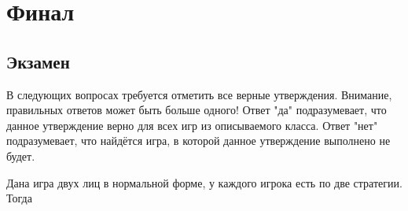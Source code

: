 \section{Финал}

\subsection{Экзамен}

\task
В следующих вопросах требуется отметить все верные утверждения. Внимание, правильных ответов может быть больше одного! Ответ "да" подразумевает, что данное утверждение верно для всех игр из описываемого класса. Ответ "нет" подразумевает, что найдётся игра, в которой данное утверждение выполнено не будет.

Дана игра двух лиц в нормальной форме, у каждого игрока есть по две стратегии. Тогда

